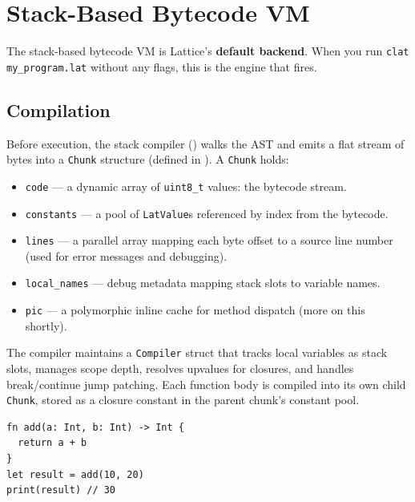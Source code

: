 \section{Stack-Based Bytecode VM}\label{sec:stack-vm}

The stack-based bytecode VM is Lattice's \textbf{default backend}. When you run
\lstinline|clat my_program.lat| without any flags, this is the engine that
fires.

\subsection{Compilation}\label{subsec:stack-compilation}

Before execution, the stack compiler () walks the
AST and emits a flat stream of bytes into a \lstinline|Chunk| structure (defined
in ). A \lstinline|Chunk| holds:

\begin{itemize}
  \item \lstinline|code| --- a dynamic array of \lstinline|uint8_t| values: the
        bytecode stream.
  \item \lstinline|constants| --- a pool of \lstinline|LatValue|s referenced by
        index from the bytecode.
  \item \lstinline|lines| --- a parallel array mapping each byte offset to a
        source line number (used for error messages and debugging).
  \item \lstinline|local_names| --- debug metadata mapping stack slots to
        variable names.
  \item \lstinline|pic| --- a polymorphic inline cache for method dispatch
        (more on this shortly).
\end{itemize}

The compiler maintains a \lstinline|Compiler| struct that tracks local
variables as stack slots, manages scope depth, resolves upvalues for closures,
and handles break/continue jump patching. Each function body is compiled into
its own child \lstinline|Chunk|, stored as a closure constant in the parent
chunk's constant pool.

\begin{lstlisting}[language=Lattice, caption={A function compiled to stack bytecode}]
fn add(a: Int, b: Int) -> Int {
  return a + b
}
let result = add(10, 20)
print(result) // 30
\end{lstlisting}

